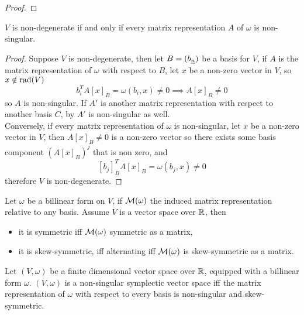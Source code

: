 \documentclass[../main-manifolds.tex]{subfiles}
\begin{document}
    \begin{proof}
        
    \end{proof}
    \begin{wts}
        $V$ is non-degenerate if and only if every matrix representation $A$ of $\omega$ is non-singular. 
    \end{wts}
    \begin{proof}
        Suppose $V$ is non-degenerate, then let $B = (\Ul{b}[n])$ be a basis for $V$, if $A$ is the matrix representation of $\omega$ with respect to $B$, let $x$ be a non-zero vector in $V$, so $x\notin \operatorname{rad}({V})$
        \[
            b_i^T A [x]_B = \omega(b_i, x)\neq 0\implies A[x]_B\neq 0
        \]
        so $A$ is non-singular. If $A'$ is another matrix representation with respect to another basis $C$, by  $A'$ is non-singular as well.\\

        Conversely, if every matrix representation of $\omega$ is non-singular, let $x$ be a non-zero vector in $V$, then $A[x]_B\neq 0$ is a non-zero vector so there exists some basis component  $(A[x]_B)^j$ that is non zero, and
        \[
            [b_j]_B^TA[x]_B = \omega(b_j,x)\neq 0
        \]
        therefore $V$ is non-degenerate.
    \end{proof}
    \begin{wts}
        Let $\omega$ be a billinear form on $V$, if $\mathcal{M}(\omega)$ the induced matrix representation relative to any basis. Assume $V$ is a vector space over $\mathbb{R}$, then
        \begin{itemize}
            \item it is symmetric iff $\mathcal{M}(\omega)$ symmetric as a matrix,
            \item it is skew-symmetric, iff alternating iff $\mathcal{M}(\omega)$ is skew-symmetric as a matrix.
        \end{itemize}
    \end{wts}
    
    \begin{corollary}\label{non-singular-symplectic-form-matrix}
        Let $(V,\omega)$ be a finite dimensional vector space over $\mathbb{R}$, equipped with a billinear form $\omega$. $(V,\omega)$ is a non-singular symplectic vector space iff the matrix representation of $\omega$ with respect to every basis is non-singular and skew-symmetric.
    \end{corollary}
    
\end{document}
